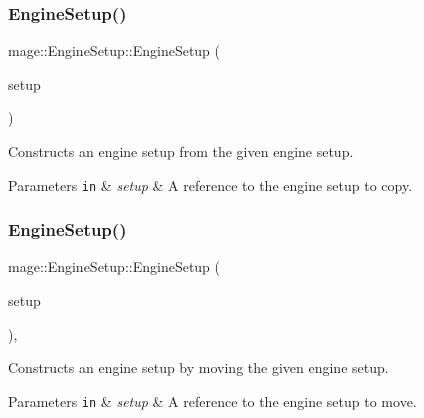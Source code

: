 \subsubsection{\texorpdfstring{Engine\+Setup()}{EngineSetup()}\hspace{0.1cm}{\footnotesize\ttfamily [2/3]}}
{\footnotesize\ttfamily mage\+::\+Engine\+Setup\+::\+Engine\+Setup (\begin{DoxyParamCaption}\item[{const \mbox{\hyperlink{classmage_1_1_engine_setup}{Engine\+Setup}} \&}]{setup }\end{DoxyParamCaption})\hspace{0.3cm}{\ttfamily [default]}}

Constructs an engine setup from the given engine setup.


\begin{DoxyParams}[1]{Parameters}
\mbox{\tt in}  & {\em setup} & A reference to the engine setup to copy. \\
\hline
\end{DoxyParams}
\mbox{\label{classmage_1_1_engine_setup_a22b87954ad7a2bc26ff7f26fb443c58c}} 
\subsubsection{\texorpdfstring{Engine\+Setup()}{EngineSetup()}\hspace{0.1cm}{\footnotesize\ttfamily [3/3]}}
{\footnotesize\ttfamily mage\+::\+Engine\+Setup\+::\+Engine\+Setup (\begin{DoxyParamCaption}\item[{\mbox{\hyperlink{classmage_1_1_engine_setup}{Engine\+Setup}} \&\&}]{setup }\end{DoxyParamCaption})\hspace{0.3cm}{\ttfamily [default]}, {\ttfamily [noexcept]}}

Constructs an engine setup by moving the given engine setup.


\begin{DoxyParams}[1]{Parameters}
\mbox{\tt in}  & {\em setup} & A reference to the engine setup to move. \\
\hline
\end{DoxyParams}
\mbox{\label{classmage_1_1_engine_setup_a0480bee101756b72233a1aa7d44eb185}} 
